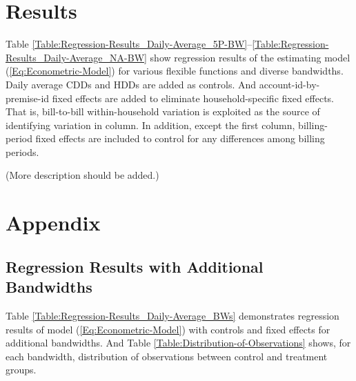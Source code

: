\begin{landscape}
        
\end{landscape}

\begin{landscape}
        
\end{landscape}

\begin{landscape}
        
\end{landscape}

\begin{landscape}
        
\end{landscape}

\begin{landscape}
        
\end{landscape}


\section{Results}
Table \ref{Table:Regression-Results_Daily-Average_5P-BW}--\ref{Table:Regression-Results_Daily-Average_NA-BW} show regression results of the estimating model (\ref{Eq:Econometric-Model}) for various flexible functions and diverse bandwidths. Daily average CDDs and HDDs are added as controls. And account-id-by-premise-id fixed effects are added to eliminate household-specific fixed effects. That is, bill-to-bill within-household variation is exploited as the source of identifying variation in column. In addition, except the first column, billing-period fixed effects are included to control for any differences among billing periods.
\par
\vspace{1.0cm}
(More description should be added.)



\clearpage
\appendix
\section{Appendix}
\subsection{Regression Results with Additional Bandwidths}
Table \ref{Table:Regression-Results_Daily-Average_BWs} demonstrates regression results of model (\ref{Eq:Econometric-Model}) with controls and fixed effects for additional bandwidths. And Table \ref{Table:Distribution-of-Observations} shows, for each bandwidth, distribution of observations between control and treatment groups.


